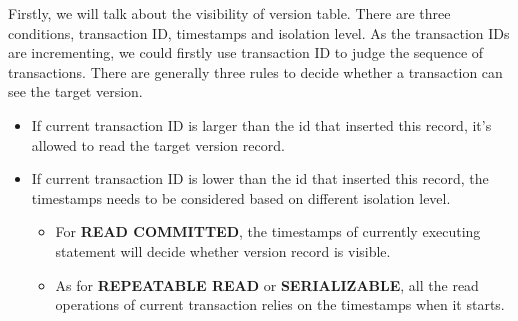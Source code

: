 Firstly, we will talk about the visibility of version table. There are three conditions, transaction ID, timestamps and isolation level. As the transaction IDs  are incrementing, we could firstly use transaction ID to judge the sequence of transactions. There are generally three rules to decide whether a transaction can see the target version.	
\begin{itemize}
	\item If current transaction ID is larger than the id that inserted this record, it's allowed to read the target version record.
	\item If current transaction ID is lower than the id that inserted this record, the timestamps needs to be considered based on different isolation level.
	\begin{itemize}
		\item For \textbf{READ COMMITTED}, the timestamps of currently executing statement will decide whether version record is visible.
		\item As for \textbf{REPEATABLE READ} or \textbf{SERIALIZABLE}, all the read operations of current transaction relies on the timestamps when it starts.
	\end{itemize}
\end{itemize}

